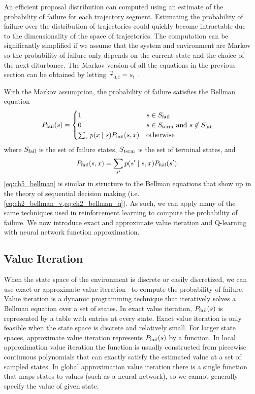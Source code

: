 An efficient proposal distribution can computed using an estimate of the probability of failure for each trajectory segment. Estimating the probability of failure over the distribution of trajectories could quickly become intractable due to the dimensionality of the space of trajectories. The computation can be significantly simplified if we assume that the system and environment are Markov so the probability of failure only depends on the current state and the choice of the next diturbance. The Markov version of all the equations in the previous section can be obtained by letting $\vec{\tau}_{0,t} = s_t$ .

With the Markov assumption, the probability of failure satisfies the Bellman equation
\begin{equation}
    P_{\rm fail}(s) = \begin{cases}
    1 & s \in S_{\rm fail} \\
    0 & s \in S_{\rm term} \text{ and } s \not \in S_{\rm fail} \\
    \sum_x p(x \mid s) P_{\rm fail}(s, x) & \text{otherwise}
    \end{cases} \label{eq:ch5_bellman}
\end{equation}
where $S_{\rm fail}$ is the set of failure states, $S_{\rm term}$ is the set of terminal states, and
\begin{equation}
    P_{\rm fail}(s, x) = \sum_{s'} p(s' \mid s, x) P_{\rm fail}(s') \text{.}
\end{equation}
\cref{eq:ch5_bellman} is similar in structure to the Bellman equations that show up in the theory of sequential decision making (i.e. \cref{eq:ch2_bellman_v,eq:ch2_bellman_q}). As such, we can apply many of the same techniques used in reinforcement learning to compute the probability of failure. We now introduce exact and approximate value iteration and Q-learning with neural network function approximation. 

\subsection{Value Iteration}

When the state space of the environment is discrete or easily discretized, we can use exact or approximate value iteration~\cite{dmubook} to compute the probability of failure. Value iteration is a dynamic programming technique that iteratively solves a Bellman equation over a set of states. In exact value iteration, $P_{\rm fail}(s)$ is represented by a table with entries at every state. Exact value iteration is only feasible when the state space is discrete and relatively small. For larger state spaces, approximate value iteration represents $P_{\rm fail}(s)$ by a function. In local approximation value iteration the function is usually constructed from piecewise continuous polynomials that can exactly satisfy the estimated value at a set of sampled states. In global approximation value iteration there is a single function that maps states to values (such as a neural network), so we cannot generally specify the value of given state. 


